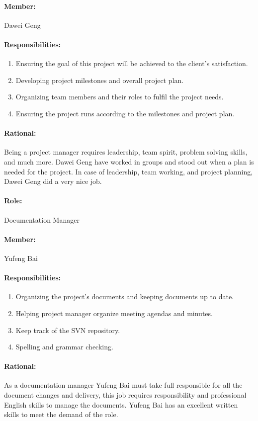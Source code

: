 \documentclass[11pt, a4paper]{report}
\begin{document}
\paragraph{Member: } Dawei Geng
\paragraph{Responsibilities: }
\begin{enumerate}
	\item  Ensuring the goal of this project will be achieved to the client's satisfaction.
	\item  Developing project milestones and overall project plan.
	\item  Organizing team members and their roles to fulfil the project needs.
	\item  Ensuring the project runs according to the milestones and project plan.
\end{enumerate}
\paragraph{Rational: \\} 
Being a project manager requires leadership, team spirit, problem solving skills, and much more. Dawei Geng have worked in groups and stood out when a plan is needed for the project. In case of leadership, team working, and project planning, Dawei Geng did a very nice job. 

\paragraph{Role: } Documentation Manager
\paragraph{Member: } Yufeng Bai
\paragraph{Responsibilities: }
\begin{enumerate}
	\item  Organizing the project's documents and keeping documents up to date.
	\item  Helping project manager organize meeting agendas and minutes.
	\item  Keep track of the SVN repository.
	\item  Spelling and grammar checking.
\end{enumerate}
\paragraph{Rational: \\}
As a documentation manager Yufeng Bai must take full responsible for all the document changes and delivery, this job requires responsibility and professional English skills to manage the documents. Yufeng Bai has an excellent written skills to meet the demand of the role.
\end{document}
